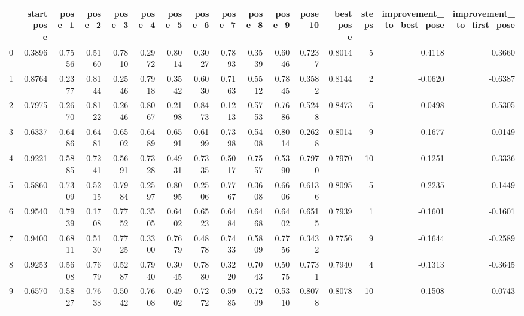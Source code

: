 \begin{tabular}{lrrrrrrrrrrrrrrr}
\toprule
{} &  start\_pose &  pose\_1 &  pose\_2 &  pose\_3 &  pose\_4 &  pose\_5 &  pose\_6 &  pose\_7 &  pose\_8 &  pose\_9 &  pose\_10 &  best\_pose &  steps &  improvement\_to\_best\_pose &  improvement\_to\_first\_pose \\
\midrule
0   &      0.3896 &  0.7556 &  0.5160 &  0.7810 &  0.2972 &  0.8014 &  0.3027 &  0.7893 &  0.3539 &  0.6046 &   0.7237 &     0.8014 &      5 &                    0.4118 &                     0.3660 \\
1   &      0.8764 &  0.2377 &  0.8144 &  0.2546 &  0.7918 &  0.3542 &  0.6030 &  0.7163 &  0.5512 &  0.7845 &   0.3582 &     0.8144 &      2 &                   -0.0620 &                    -0.6387 \\
2   &      0.7975 &  0.2670 &  0.8122 &  0.2646 &  0.8067 &  0.2198 &  0.8473 &  0.1213 &  0.5753 &  0.7686 &   0.5248 &     0.8473 &      6 &                    0.0498 &                    -0.5305 \\
3   &      0.6337 &  0.6486 &  0.6481 &  0.6502 &  0.6489 &  0.6591 &  0.6199 &  0.7398 &  0.5408 &  0.8014 &   0.2628 &     0.8014 &      9 &                    0.1677 &                     0.0149 \\
4   &      0.9221 &  0.5885 &  0.7241 &  0.5691 &  0.7328 &  0.4931 &  0.7335 &  0.5017 &  0.7557 &  0.5390 &   0.7970 &     0.7970 &     10 &                   -0.1251 &                    -0.3336 \\
5   &      0.5860 &  0.7309 &  0.5215 &  0.7984 &  0.2597 &  0.8095 &  0.2506 &  0.7767 &  0.3608 &  0.6606 &   0.6136 &     0.8095 &      5 &                    0.2235 &                     0.1449 \\
6   &      0.9540 &  0.7939 &  0.1708 &  0.7752 &  0.3505 &  0.6402 &  0.6523 &  0.6484 &  0.6468 &  0.6402 &   0.6515 &     0.7939 &      1 &                   -0.1601 &                    -0.1601 \\
7   &      0.9400 &  0.6811 &  0.5130 &  0.7725 &  0.3300 &  0.7679 &  0.4878 &  0.7433 &  0.5809 &  0.7756 &   0.3432 &     0.7756 &      9 &                   -0.1644 &                    -0.2589 \\
8   &      0.9253 &  0.5608 &  0.7679 &  0.5287 &  0.7940 &  0.3045 &  0.7880 &  0.3220 &  0.7043 &  0.5075 &   0.7731 &     0.7940 &      4 &                   -0.1313 &                    -0.3645 \\
9   &      0.6570 &  0.5827 &  0.7638 &  0.5042 &  0.7608 &  0.4902 &  0.7272 &  0.5985 &  0.7209 &  0.5310 &   0.8078 &     0.8078 &     10 &                    0.1508 &                    -0.0743 \\

\end{tabular}
